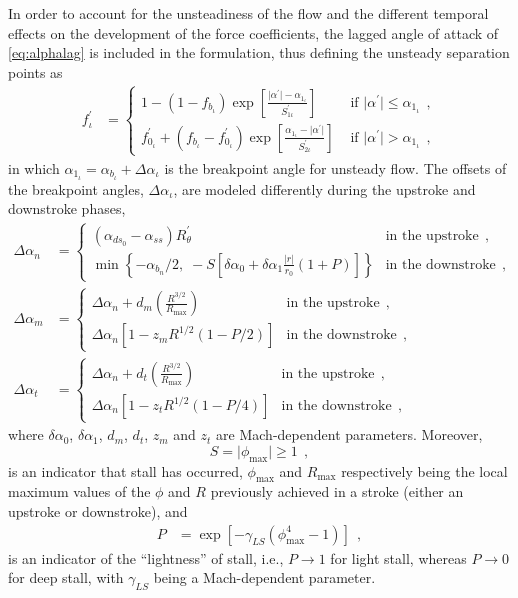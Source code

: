 \documentclass[12pt,a4paper,oneside,english]{abntex2} %
\newcommand{\abs}[1]{\lvert#1\rvert}
\def\lb{\left[}
\def\rb{\right]}
\def\lp{\left(}
\def\rp{\right)}
\def\alphalag{\alpha^\prime}
\def\maxim{_\text{max}}
\begin{document}
In order to account for the unsteadiness of the flow and the different temporal effects on the development of the force coefficients, the lagged angle of attack of \cref{eq:alphalag} is included in the formulation, thus defining the unsteady separation points as
\begin{align}
    f^\prime_\iota &=
    \begin{cases}
        1-(1-f_{b_\iota})\exp\lb \frac{\abs{\alphalag}-\alpha_{1_\iota}}{S_{1\iota}^\prime} \rb &\text{ if } \abs{\alphalag} \leq \alpha_{1_\iota} \ \ ,
	\\ 
	f_{0_\iota}^\prime+(f_{b_\iota}-  
        f_{0_\iota}^\prime)\exp\lb \frac{\alpha_{1_\iota}-\abs{\alphalag}}{S_{2\iota}^\prime}\rb &\text{ 
        if } \abs{\alphalag} > \alpha_{1_\iota} \ \ ,
    \end{cases}
    \label{eq:fprime}
\end{align}
in which $\alpha_{1_\iota} = \alpha_{b_{\iota}}+\Delta\alpha_\iota$ is the breakpoint angle for unsteady flow. The offsets of the breakpoint angles, $\Delta\alpha_\iota$, are modeled differently during the upstroke and downstroke phases,
\begin{align}
	\Delta\alpha_{n} &=
	\begin{cases}
		\lp\alpha_{ds_0}-\alpha_{ss}\rp R^{\prime}_\theta  &\text{in the upstroke} \ \ ,
		\\	
		\min \left\{-\alpha_{b_n}/2, \; -S\lb\delta\alpha_0 + \delta\alpha_1 \frac{\abs{r}}{r_0}\lp1+P\rp\rb \right\} &\text{in the downstroke} \ \ ,
	\label{eq:dalphan} 	
	\end{cases}
	\\
	\Delta\alpha_{m} &= 
	\begin{cases}
		\Delta\alpha_{n} + d_m \lp\frac{R^{3/2}}{R\maxim}\rp &\text{in the upstroke} \ \ ,
		\\
		\Delta\alpha_{n}\lb1-z_mR^{1/2}\lp1-P/2\rp\rb &\text{in the downstroke} \ \ ,
	\label{eq:dalpham}
	\end{cases}	 
	\\
	\Delta\alpha_{t} &= 
	\begin{cases}
		\Delta\alpha_{n} + d_t \lp\frac{R^{3/2}}{R\maxim}\rp &\text{in the upstroke} \ \ ,
		\\
		\Delta\alpha_{n}\lb1-z_tR^{1/2}\lp1-P/4\rp\rb &\text{in the downstroke} \ \ ,
	\label{eq:dalphat}
	\end{cases}	 
\end{align}
where $\delta\alpha_0$, $\delta\alpha_1$, $d_m$, $d_t$, $z_m$ and $z_t$ are Mach-dependent parameters. Moreover, 
\begin{equation}
    S=\abs{\phi\maxim}\geq1 \ \ ,
    \label{eq:S}
\end{equation}
is an indicator that stall has occurred, $\phi\maxim$ and $R\maxim$ respectively being the local maximum values of the $\phi$ and $R$ previously achieved in a stroke (either an upstroke or downstroke), and
\begin{align}
    P &= \exp \lb -\gamma_{LS}\lp\phi\maxim^4-1\rp\rb \ \ ,
    \label{eq:P}
\end{align}
is an indicator of the ``lightness'' of stall, i.e., $P\rightarrow1$ for light stall, whereas $P\rightarrow0$ for deep stall, with $\gamma_{LS}$ being a Mach-dependent parameter.
\end{document}
